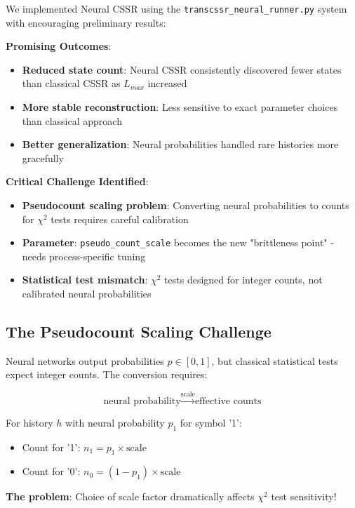 \documentclass[11pt]{article}
\begin{document}
\begin{resultbox}
We implemented Neural CSSR using the \texttt{transcssr\_neural\_runner.py} system with encouraging preliminary results:

\textbf{Promising Outcomes}:
\begin{itemize}
\item \textbf{Reduced state count}: Neural CSSR consistently discovered fewer states than classical CSSR as $L_{max}$ increased
\item \textbf{More stable reconstruction}: Less sensitive to exact parameter choices than classical approach
\item \textbf{Better generalization}: Neural probabilities handled rare histories more gracefully
\end{itemize}

\textbf{Critical Challenge Identified}:
\begin{itemize}
\item \textbf{Pseudocount scaling problem}: Converting neural probabilities to counts for $\chi^2$ tests requires careful calibration
\item \textbf{Parameter}: \texttt{pseudo\_count\_scale} becomes the new "brittleness point" - needs process-specific tuning
\item \textbf{Statistical test mismatch}: $\chi^2$ tests designed for integer counts, not calibrated neural probabilities
\end{itemize}
\end{resultbox}

\subsection{The Pseudocount Scaling Challenge}

\begin{notebox}
Neural networks output probabilities $p \in [0,1]$, but classical statistical tests expect integer counts. The conversion requires:

$$\text{neural probability} \xrightarrow{\text{scale}} \text{effective counts}$$

For history $h$ with neural probability $p_1$ for symbol '1':
\begin{itemize}
\item Count for '1': $n_1 = p_1 \times \text{scale}$
\item Count for '0': $n_0 = (1-p_1) \times \text{scale}$
\end{itemize}

\textbf{The problem}: Choice of scale factor dramatically affects $\chi^2$ test sensitivity!
\end{notebox}
\end{document}

